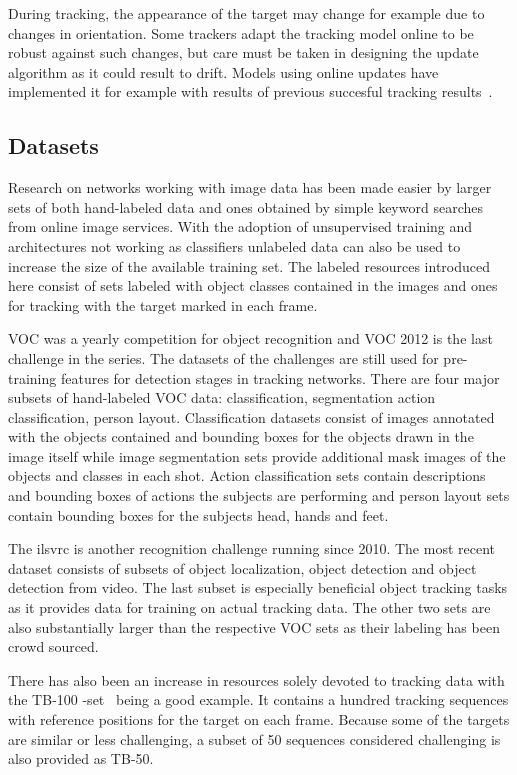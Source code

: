 During tracking, the appearance of the target may change for example due to changes in
orientation. Some trackers adapt the tracking model online to be robust against such
changes, but care must be taken in designing the update algorithm as it could result
to drift. Models using online updates have implemented it for example with results of
previous succesful tracking results~\cite{BLUR_TRACK}.

\subsection{Datasets}
Research on networks working with image data has been made easier by larger sets of both
hand-labeled data and ones obtained by simple keyword searches from online image services.
With the adoption of unsupervised training and architectures not working as classifiers
unlabeled data can also be used to increase the size of the available training set.
The labeled resources introduced here consist of sets labeled with object classes contained
in the images and ones for tracking with the target marked in each frame.

VOC was a yearly competition for object recognition and VOC 2012 \cite{VOC12} is the last
challenge in the series. The datasets of the challenges are still used for pre-training
features for detection stages in tracking networks. There are four major subsets of
hand-labeled VOC data: classification, segmentation action classification, person layout.
Classification datasets consist of images annotated with the objects contained and bounding
boxes for the objects drawn in the image itself while image segmentation sets provide
additional mask images of the objects and classes in each shot. Action classification sets
contain descriptions and bounding boxes of actions the subjects are performing and person
layout sets contain bounding boxes for the subjects head, hands and feet.

The \ac{ilsvrc} \cite{ILSVRC15} is another recognition challenge running since 2010. The
most recent dataset consists of subsets of object localization, object detection and
object detection from video. The last subset is especially beneficial object tracking
tasks as it provides data for training on actual tracking data. The other two sets are also
substantially larger than the respective VOC sets as their labeling has been crowd sourced.

There has also been an increase in resources solely devoted to tracking data with the
TB-100 -set~\cite{VTB} being a good example. It contains a hundred tracking sequences
with reference positions for the target on each frame. Because some of the targets are
similar or less challenging, a subset of 50 sequences considered challenging is also
provided as TB-50.~\cite{OT_BENCH}


